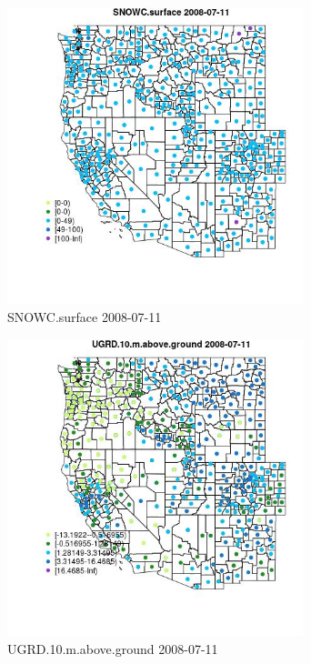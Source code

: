 \begin{figure} 
\centering  
\includegraphics[width=0.77\textwidth]{Code_Outputs/df_report_ML_predictors_CountyCentroid_Locations_Dates_2008-01-01to2018-12-31_MapObsSNOWCsurface2008-07-11.jpg} 
\caption{\label{fig:df_report_ML_predictors_CountyCentroid_Locations_Dates_2008-01-01to2018-12-31MapObsSNOWCsurface2008-07-11}SNOWC.surface 2008-07-11} 
\end{figure} 
 

\begin{figure} 
\centering  
\includegraphics[width=0.77\textwidth]{Code_Outputs/df_report_ML_predictors_CountyCentroid_Locations_Dates_2008-01-01to2018-12-31_MapObsUGRD10maboveground2008-07-11.jpg} 
\caption{\label{fig:df_report_ML_predictors_CountyCentroid_Locations_Dates_2008-01-01to2018-12-31MapObsUGRD10maboveground2008-07-11}UGRD.10.m.above.ground 2008-07-11} 
\end{figure} 
 


